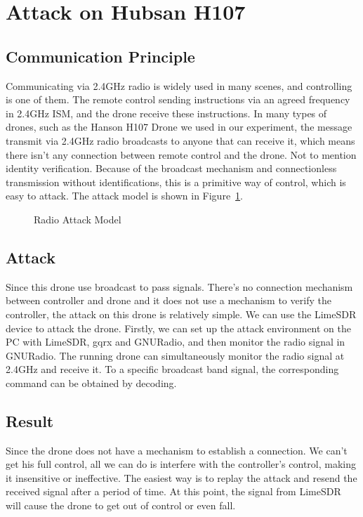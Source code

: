 \documentclass{acm_proc_article-sp}
\begin{document}
\section{Attack on Hubsan H107}

\subsection{Communication Principle}

Communicating via 2.4GHz radio is widely used in many scenes, and controlling is one of them. The remote control sending instructions via an agreed frequency in 2.4GHz ISM, and the drone receive these instructions. In many types of drones, such as the Hanson H107 Drone we used in our experiment, the message transmit via 2.4GHz radio broadcasts to anyone that can receive it, which means there isn't any connection between remote control and the drone. Not to mention identity verification. Because of the broadcast mechanism and connectionless transmission without identifications, this is a primitive way of control, which is easy to attack. The attack model is shown in Figure~\ref{radio}.

\begin{figure}
\centering
{}
\caption{Radio Attack Model}
\label{radio}
\end{figure}

\subsection{Attack}

Since this drone use broadcast to pass signals. There's no connection mechanism between controller and drone and it does not use a mechanism to verify the controller, the attack on this drone is relatively simple. We can use the LimeSDR device to attack the drone. Firstly, we can set up the attack environment on the PC with LimeSDR, gqrx and GNURadio, and then monitor the radio signal in GNURadio. The running drone can simultaneously monitor the radio signal at 2.4GHz and receive it. To a specific broadcast band signal, the corresponding command can be obtained by decoding.

\subsection{Result}

Since the drone does not have a mechanism to establish a connection. We can't get his full control, all we can do is interfere with the controller's control, making it insensitive or ineffective. The easiest way is to replay the attack and resend the received signal after a period of time. At this point, the signal from LimeSDR will cause the drone to get out of control or even fall.
\end{document}
